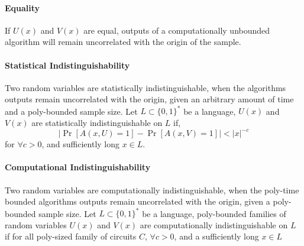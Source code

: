 \paragraph{Equality} 

If $U(x)$ and $V(x)$ are equal, outputs of a computationally unbounded algorithm will remain uncorrelated with the origin of the sample.

\paragraph{Statistical Indistinguishability} Two random variables are statistically indistinguishable, when the algorithms outputs remain uncorrelated with the origin, given an arbitrary amount of time and a poly-bounded sample size.
\bigskip
\newline
Let $L \subset \{0,1\}^*$ be a language, $U(x)$ and $V(x)$ are statistically indistinguishable on $L$ if,
\bigskip
$$|\Pr [A(x, U) = 1] - \Pr [A(x, V) = 1]| < |x|^{-c}$$ %
\bigskip
\newline
for $\forall c > 0$, and sufficiently long $x \in L$. 

%
%
%
%
%
%

\paragraph{Computational Indistinguishability} %
Two random variables are computationally indistinguishable, when the poly-time bounded algorithms outputs remain uncorrelated with the origin, given a poly-bounded sample size.
\bigskip
\newline
Let $L \subset \{0,1\}^*$ be a language, poly-bounded families of random variables $U(x)$ and $V(x)$ are computationally indistinguishable on $L$ if for all poly-sized family of circuits $C$, $\forall c > 0$, and a sufficiently long $x \in L$

